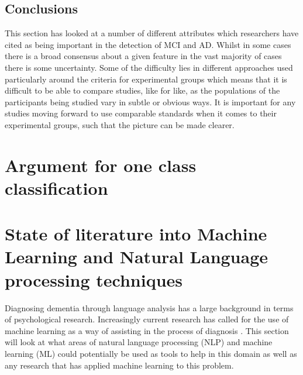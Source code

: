 \documentclass[10pt, letterpaper, twoside, openany]{thesis}
\begin{document}
\subsection{Conclusions}
This section has looked at a number of different attributes which researchers have cited as being important in the detection of MCI and AD. Whilst in some cases there is a broad consensus about a given feature in the vast majority of cases there is some uncertainty. Some of the difficulty lies in different approaches used particularly around the criteria for experimental groups which means that it is difficult to be able to compare studies, like for like, as the populations of the participants being studied vary in subtle or obvious ways. It is important for any studies moving forward to use comparable standards when it comes to their experimental groups, such that the picture can be made clearer.
\section{Argument for one class classification}



\section{State of literature into Machine Learning and Natural Language processing techniques}
Diagnosing dementia through language analysis has a large background in terms of psychological research. Increasingly current research has called for the use of machine learning as a way of assisting in the process of diagnosis \cite{Orimaye2017, Boschi2017}. This section will look at what areas of natural language processing (NLP) and machine learning (ML) could potentially be used as tools to help in this domain as well as any research that has applied machine learning to this problem.
\end{document}
